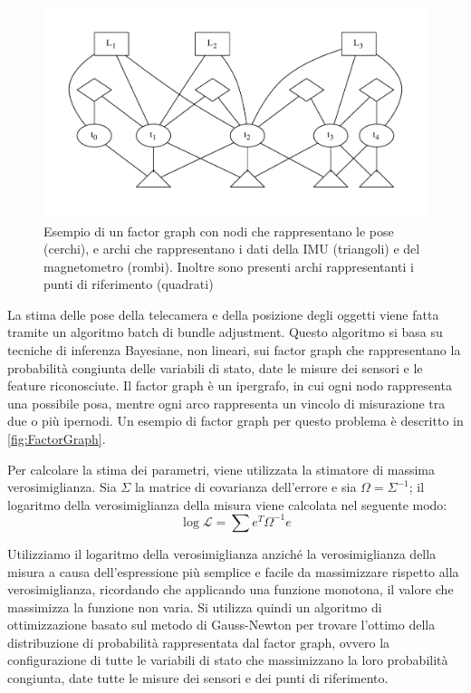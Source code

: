 \begin{figure}[ht]
  \includegraphics[width=\textwidth]{diagrammi/FactorGraph}
  \caption[Esempio di Factor Graph]{Esempio di un factor graph con nodi che rappresentano le pose (cerchi), e archi che rappresentano i dati della IMU (triangoli) e del magnetometro (rombi). Inoltre sono presenti archi rappresentanti i punti di riferimento (quadrati) }
  \label{fig:FactorGraph}
\end{figure}

La stima delle pose della telecamera e della posizione degli oggetti viene fatta tramite un algoritmo batch di bundle adjustment.
Questo algoritmo si basa su tecniche di inferenza Bayesiane, non lineari, sui factor graph che rappresentano la probabilità congiunta delle variabili di stato, date le misure dei sensori e le feature riconosciute.
Il factor graph è un ipergrafo, in cui ogni nodo rappresenta una possibile posa, mentre ogni arco rappresenta un vincolo di misurazione tra due o più ipernodi. Un esempio di factor graph per questo problema è descritto in \autoref{fig:FactorGraph}.

Per calcolare la stima dei parametri, viene utilizzata la stimatore di massima verosimiglianza. Sia $\Sigma$ la matrice di covarianza dell'errore e sia $\Omega = \Sigma^{-1}$; il logaritmo della verosimiglianza della misura viene calcolata nel seguente modo:
\begin{equation*}
 \log\mathcal{L}=\sum e^{T}\Omega^{-1}e
\end{equation*}

Utilizziamo il logaritmo della verosimiglianza anziché la verosimiglianza della misura a causa dell'espressione più semplice e facile da massimizzare rispetto alla verosimiglianza, ricordando che applicando una funzione monotona, il valore che massimizza la funzione non varia.
Si utilizza quindi un algoritmo di ottimizzazione basato sul metodo di Gauss-Newton per trovare l'ottimo della distribuzione di probabilità rappresentata dal factor graph, ovvero la configurazione di tutte le variabili di stato che massimizzano la loro probabilità congiunta, date tutte le misure dei sensori e dei punti di riferimento.

